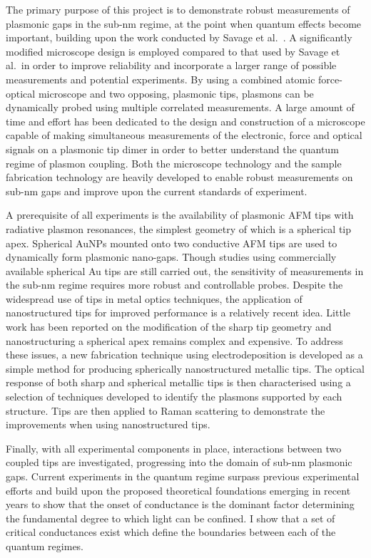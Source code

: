\documentclass[12pt, a4paper, twoside]{book}
\begin{document}
The primary purpose of this project is to demonstrate robust measurements of plasmonic gaps in the sub-nm regime, at the point when quantum effects become important, building upon the work conducted by Savage et al.\ \cite{savage2012}. A significantly modified microscope design is employed compared to that used by Savage et al.\ in order to improve reliability and incorporate a larger range of possible measurements and potential experiments. By using a combined atomic force-optical microscope and two opposing, plasmonic tips, plasmons can be dynamically probed using multiple correlated measurements. A large amount of time and effort has been dedicated to the design and construction of a microscope capable of making simultaneous measurements of the electronic, force and optical signals on a plasmonic tip dimer in order to better understand the quantum regime of plasmon coupling. Both the microscope technology and the sample fabrication technology are heavily developed to enable robust measurements on sub-nm gaps and improve upon the current standards of experiment.

A prerequisite of all experiments is the availability of plasmonic AFM tips with radiative plasmon resonances, the simplest geometry of which is a spherical tip apex. Spherical AuNPs mounted onto two conductive AFM tips are used to dynamically form plasmonic nano-gaps. Though studies using commercially available spherical Au tips are still carried out, the sensitivity of measurements in the sub-nm regime requires more robust and controllable probes. Despite the widespread use of tips in metal optics techniques, the application of nanostructured tips for improved performance is a relatively recent idea. Little work has been reported on the modification of the sharp tip geometry and nanostructuring a spherical apex remains complex and expensive. To address these issues, a new fabrication technique using electrodeposition is developed as a simple method for producing spherically nanostructured metallic tips. The optical response of both sharp and spherical metallic tips is then characterised using a selection of techniques developed to identify the plasmons supported by each structure. Tips are then applied to Raman scattering to demonstrate the improvements when using nanostructured tips.

Finally, with all experimental components in place, interactions between two coupled tips are investigated, progressing into the domain of sub-nm plasmonic gaps. Current experiments in the quantum regime surpass previous experimental efforts and build upon the proposed theoretical foundations emerging in recent years to show that the onset of conductance is the dominant factor determining the fundamental degree to which light can be confined. I show that a set of critical conductances exist which define the boundaries between each of the quantum regimes.
\end{document}
